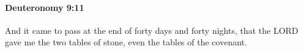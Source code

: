 
		\paragraph{Deuteronomy 9:11} %
			\label{DEUTERONOMY-9-11}

			And it came to pass at the end of forty days and forty nights, that the LORD gave me the two tables of stone, even the tables of the covenant.



